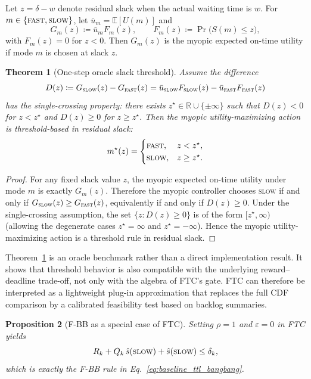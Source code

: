 \documentclass[preprint,12pt]{elsarticle}
\newtheorem{theorem}{Theorem}[section]
\newtheorem{proposition}[theorem]{Proposition}
\begin{document}
Let $z=\delta-w$ denote residual slack when the actual waiting time is $w$. For $m\in\{\textsc{fast},\textsc{slow}\}$, let $\bar u_m = \mathbb E[U(m)]$ and
\[
G_m(z)\coloneqq \bar u_m F_m(z),
\qquad
F_m(z)\coloneqq \Pr\!\bigl(S(m)\le z\bigr),
\]
with $F_m(z)=0$ for $z<0$. Then $G_m(z)$ is the myopic expected on-time utility if mode $m$ is chosen at slack $z$.

\begin{theorem}[One-step oracle slack threshold]
\label{thm:oracle_threshold}
Assume the difference
\[
D(z)\coloneqq G_{\textsc{slow}}(z)-G_{\textsc{fast}}(z)
= \bar u_{\textsc{slow}}F_{\textsc{slow}}(z)-\bar u_{\textsc{fast}}F_{\textsc{fast}}(z)
\]
has the single-crossing property: there exists $z^{\star}\in\mathbb R\cup\{\pm\infty\}$ such that $D(z)<0$ for $z<z^{\star}$ and $D(z)\ge 0$ for $z\ge z^{\star}$. Then the myopic utility-maximizing action is threshold-based in residual slack:
\[
m^{\star}(z)=
\begin{cases}
\textsc{fast}, & z<z^{\star},\\
\textsc{slow}, & z\ge z^{\star}.
\end{cases}
\]
\end{theorem}

\begin{proof}
For any fixed slack value $z$, the myopic expected on-time utility under mode $m$ is exactly $G_m(z)$. Therefore the myopic controller chooses \textsc{slow} if and only if $G_{\textsc{slow}}(z)\ge G_{\textsc{fast}}(z)$, equivalently if and only if $D(z)\ge 0$. Under the single-crossing assumption, the set $\{z:D(z)\ge 0\}$ is of the form $[z^{\star},\infty)$ (allowing the degenerate cases $z^{\star}=\infty$ and $z^{\star}=-\infty$). Hence the myopic utility-maximizing action is a threshold rule in residual slack.
\end{proof}

Theorem~\ref{thm:oracle_threshold} is an oracle benchmark rather than a direct implementation result. It shows that threshold behavior is also compatible with the underlying reward--deadline trade-off, not only with the algebra of FTC's gate. FTC can therefore be interpreted as a lightweight plug-in approximation that replaces the full CDF comparison by a calibrated feasibility test based on backlog summaries.

\begin{proposition}[F-BB as a special case of FTC]
\label{prop:fbb_special_case}
Setting $\rho=1$ and $\varepsilon=0$ in FTC yields
\[
R_k + Q_k\,\hat{s}(\textsc{slow}) + \hat{s}(\textsc{slow}) \le \delta_k,
\]
which is exactly the F-BB rule in Eq.~\eqref{eq:baseline_ttl_bangbang}.
\end{proposition}
\end{document}
